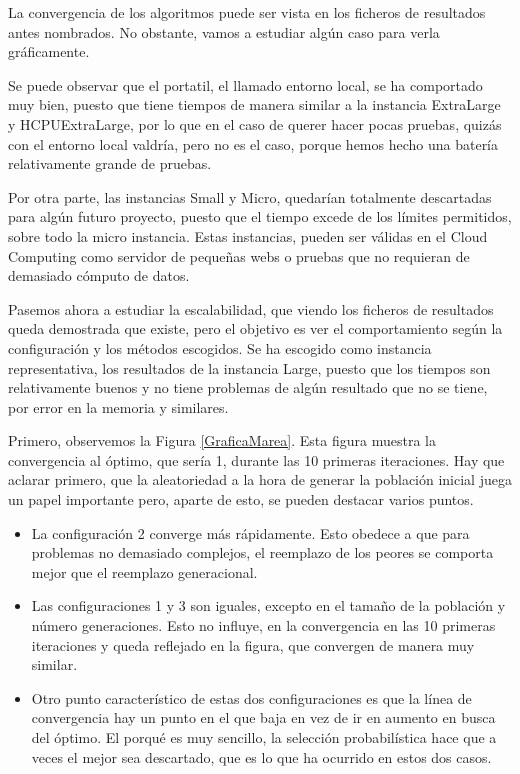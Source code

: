 \documentclass[runningheads]{llncs}
\begin{document}
La convergencia de los algoritmos puede ser vista en los ficheros de resultados antes nombrados. No obstante, vamos a estudiar 
algún caso para verla gráficamente.




Se puede observar que el portatil, el llamado entorno local, se ha comportado muy bien, puesto que tiene tiempos de manera similar a 
la instancia ExtraLarge y HCPUExtraLarge, por lo que en el caso de querer hacer pocas pruebas, quizás con el entorno local 
valdría, pero no es el caso, porque hemos hecho una batería relativamente grande de pruebas.  

Por otra parte, las instancias 
Small y Micro, quedarían totalmente descartadas para algún futuro proyecto, puesto que el tiempo excede de los límites 
permitidos, sobre todo la micro instancia. Estas instancias, pueden ser válidas en el Cloud Computing como servidor de pequeñas 
webs o pruebas que no requieran de demasiado cómputo de datos. 

Pasemos ahora a estudiar la escalabilidad, que viendo los ficheros de resultados queda demostrada que existe, pero el objetivo es 
ver el comportamiento según la configuración y los métodos escogidos. Se ha escogido como instancia representativa, los resultados 
de la instancia Large, puesto que los tiempos son relativamente buenos y no tiene problemas de algún resultado que no se tiene, 
por error en la memoria y similares.

Primero, observemos la Figura \ref{GraficaMarea}. Esta figura muestra la convergencia al óptimo, que sería 1, durante las 10 
primeras iteraciones. Hay que aclarar primero, que la aleatoriedad a la hora de generar la población inicial juega un papel 
importante pero, aparte de esto, se pueden destacar varios puntos.

\begin{itemize}
 \item La configuración 2 converge más rápidamente. Esto obedece a que para problemas no demasiado complejos, el reemplazo 
 de los peores se comporta mejor que el reemplazo generacional.
 \item Las configuraciones 1 y 3 son iguales, excepto en el tamaño de la población y número generaciones. Esto no influye, 
 en la convergencia en las 10 primeras iteraciones y queda reflejado en la figura, que convergen de manera muy similar.
 \item Otro punto característico de estas dos configuraciones es que la línea de convergencia hay un punto en el que 
 baja en vez de ir en aumento en busca del óptimo. El porqué es muy 
 sencillo, la selección probabilística hace que a veces el mejor sea descartado, que es lo que ha ocurrido en estos dos 
 casos.
\end{itemize}
\end{document}
